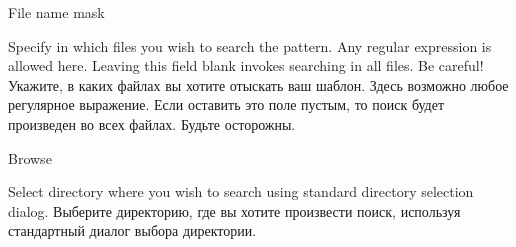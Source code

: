 \begin{popup}
\caption{File name mask}

\ifenglish
Specify in which files you wish to search the pattern. Any regular expression
is allowed here. Leaving this field blank invokes searching in all files. Be careful!
\else
Укажите, в каких файлах вы хотите отыскать ваш шаблон. Здесь возможно любое
регулярное выражение. Если оставить это поле пустым, то поиск будет произведен 
во всех файлах. Будьте осторожны.
\fi
\end{popup}

\begin{popup}
\caption{Browse}

\ifenglish
Select directory where you wish to search using standard directory selection
dialog.
\else
Выберите директорию, где вы хотите произвести поиск, используя стандартный диалог
выбора директории.
\fi
\end{popup}

